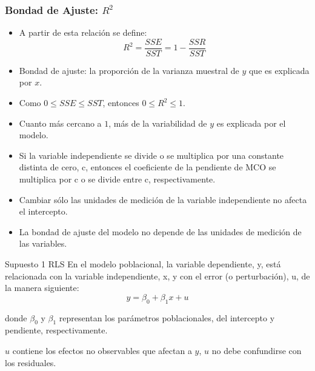\documentclass{beamer}
\begin{document}
\begin{frame}
	\frametitle{Bondad de Ajuste: $R^2$} %
	\begin{itemize}
		\item A partir de esta relación se define:
		\[ R^2 = \frac{SSE}{SST} = 1 - \frac{SSR}{SST} \]
		
		\item Bondad de ajuste: la proporción de la varianza muestral de $y$ que es explicada por $x$.
		
		\item Como $0 \leq SSE \leq SST$, entonces $0 \leq R^2 \leq 1$.
		
		
		\item Cuanto más cercano a $1$, más de la variabilidad de $y$ es explicada por el modelo.
	\end{itemize}
\end{frame}


 \begin{frame}{}

    \begin{itemize}
        \item Si la variable
 independiente se divide o se multiplica por una constante distinta de cero, c, entonces el coeficiente
de la pendiente de MCO se multiplica por c o se divide entre c, respectivamente.


\item Cambiar sólo las unidades de medición de la variable independiente no afecta el intercepto.
\item  La bondad de ajuste del modelo no
 depende de las unidades de medición de las variables.
    \end{itemize}
    
 \end{frame}



\begin{frame}{Supuesto 1 RLS}
    En el modelo poblacional, la variable dependiente, y, está relacionada con la variable independiente,
x, y con el error (o perturbación), u, de la manera siguiente:\\
$$y=\beta_0 +\beta_1x+ u$$ 

donde $\beta_0$ y $\beta_1$ representan los parámetros poblacionales, del intercepto y pendiente, respectivamente.

$u$ contiene los efectos no observables que afectan a $y$, $u$ no debe confundirse con los residuales. 

\end{frame}
\end{document}

